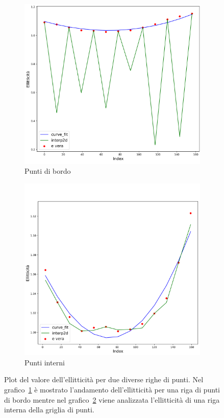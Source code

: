 \documentclass[12pt,a4paper,final]{book}
\begin{document}
\begin{figure}[!ht]
\centering
	\begin{subfigure}{0.8\textwidth}
	    \centering
	    \includegraphics[width=0.8\linewidth]{../figures/row_bordo.png}
	    \caption{Punti di bordo}
	    \label{plot_row_bordo}
	\end{subfigure}
\newline
	\begin{subfigure}{0.8\textwidth}
		\centering
	    \includegraphics[width=0.8\linewidth]{../figures/row_interno.png}
		\caption{Punti interni}
		\label{plot_row_interno}
	\end{subfigure}
\caption{Plot del valore dell'ellitticità per due diverse righe di punti. Nel grafico~\ref{plot_row_bordo} è mostrato l'andamento dell'ellitticità per una riga di punti di bordo mentre nel grafico~\ref{plot_row_interno} viene analizzata l'ellitticità di una riga interna della griglia di punti.}
\label{plot_row}
\end{figure}
\end{document}
